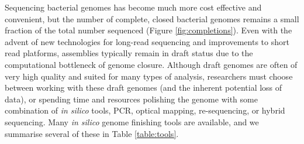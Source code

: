 \documentclass[a4,center,fleqn]{NAR}
\begin{document}
Sequencing bacterial genomes has become much more cost effective and convenient, but the number of complete, closed bacterial genomes remains a small fraction of the total number sequenced (Figure \ref{fig:completions}). Even with the advent of new technologies for long-read sequencing and improvements to short read platforms, assemblies typically remain in draft status due to the computational bottleneck of genome closure\cite{Nagarajan2010,Brouwer2016}. Although draft genomes are often of very high quality and suited for many types of analysis, researchers must choose between working with these draft genomes (and the inherent potential loss of data), or spending time and resources polishing the genome with some combination of \textit{in silico} tools, PCR, optical mapping, re-sequencing, or hybrid sequencing\cite{Nagarajan2010,Utturkar2014}. Many \textit{in silico} genome finishing tools are available, and we summarise several of these in Table \ref{table:tools}.

\enlargethispage{-65.1pt}
\end{document}
